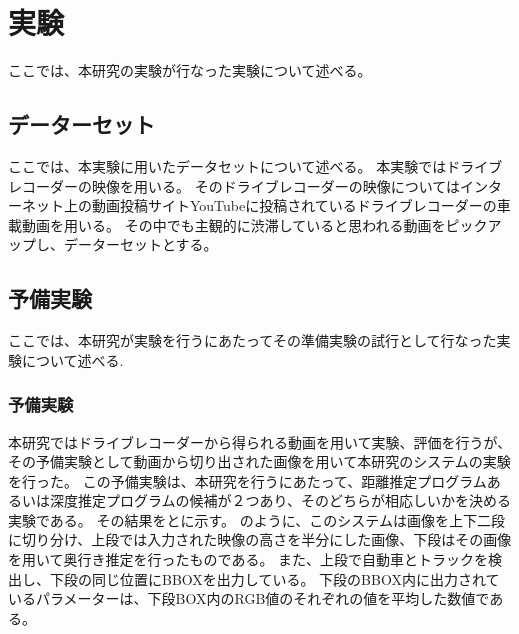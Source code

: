 \chapter{実験}
ここでは、本研究の実験が行なった実験について述べる。

\section{データーセット}
ここでは、本実験に用いたデータセットについて述べる。
本実験ではドライブレコーダーの映像を用いる。
そのドライブレコーダーの映像についてはインターネット上の動画投稿サイトYouTubeに投稿されているドライブレコーダーの車載動画を用いる。
その中でも主観的に渋滞していると思われる動画をピックアップし、データーセットとする。

\section{予備実験}
ここでは、本研究が実験を行うにあたってその準備実験の試行として行なった実験について述べる.



\subsection{予備実験}
本研究ではドライブレコーダーから得られる動画を用いて実験、評価を行うが、その予備実験として動画から切り出された画像を用いて本研究のシステムの実験を行った。
この予備実験は、本研究を行うにあたって、距離推定プログラムあるいは深度推定プログラムの候補が２つあり、そのどちらが相応しいかを決める実験である。
その結果をとに示す。
のように、このシステムは画像を上下二段に切り分け、上段では入力された映像の高さを半分にした画像、下段はその画像を用いて奥行き推定を行ったものである。
また、上段で自動車とトラックを検出し、下段の同じ位置にBBOXを出力している。
下段のBBOX内に出力されているパラメーターは、下段BOX内のRGB値のそれぞれの値を平均した数値である。

